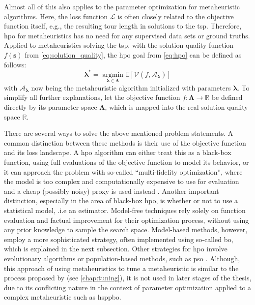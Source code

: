 Almost all of this also applies to the parameter optimization for metaheuristic algorithms. Here, the loss function $\mathcal{L}$ is often closely related to the objective function itself, e.g., the resulting tour length in solutions to the \gls{tsp}. Therefore, \gls{hpo} for metaheuristics has no need for any supervised data sets or ground truths. Applied to metaheuristics solving the \gls{tsp}, with the solution quality function $f(\mathbf{s})$ from \cref{eq:solution_quality}, the \gls{hpo} goal from \cref{eq:hpo} can be defined as follows:
\begin{equation}
	\label{eq:hpo-meta}
	\mathbf{\lambda^*} = \operatorname*{argmin}_{\mathbf{\lambda} \in \mathbf{\Lambda}} \mathbb{E} \left[ \mathcal{V}(f, \mathcal{A}_\mathbf{\lambda}) \right] 
\end{equation}
with $\mathcal{A}_\mathbf{\lambda}$ now being the metaheuristic algorithm initialized with parameters $\mathbf{\lambda}$. To simplify all further explanations, let the objective function $f: \mathcal{\mathbf{\Lambda}} \to \mathbb{R}$ be defined directly by its parameter space $\mathcal{\mathbf{\Lambda}}$, which is mapped into the real solution quality space $\mathbb{R}$.

There are several ways to solve the above mentioned problem statements. A common distinction between these methods is their use of the objective function and its loss landscape. A \gls{hpo} algorithm can either treat this as a black-box function, using full evaluations of the objective function to model its behavior, or it can approach the problem with so-called \enquote{multi-fidelity optimization}, where the model is too complex and computationally expensive to use for evaluation and a cheap (possibly noisy) proxy is used instead \cite{feurer2019hyperparameter}. Another important distinction, especially in the area of black-box \gls{hpo}, is whether or not to use a statistical model, .i.e an estimator. Model-free techniques rely solely on function evaluation and factual improvement for their optimization process, without using any prior knowledge to sample the search space. Model-based methods, however, employ a more sophisticated strategy, often implemented using so-called \gls{bo}, which is explained in the next subsection. Other strategies for \gls{hpo} involve evolutionary algorithms or population-based methods, such as \gls{pso} \cite{yang2020hyperparameter}. Although, this approach of using metaheuristics to tune a metaheuristic is similar to the process proposed by \cite{talbi2009metaheuristics} (see \cref{chap:tuning}), it is not used in later stages of the thesis, due to its conflicting nature in the context of parameter optimization applied to a complex metaheuristic such as \gls{hsppbo}.

